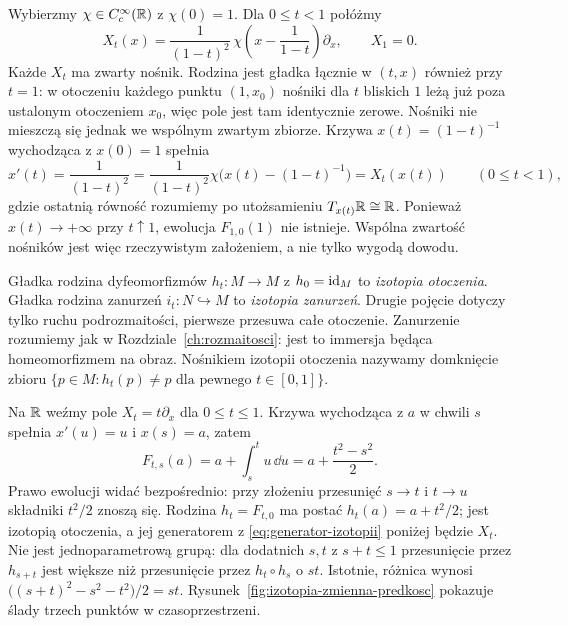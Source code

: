 \begin{przyklad}
Wybierzmy $\chi\in C_c^\infty(\mathbb{R})$ z $\chi(0)=1$.
Dla $0\le t<1$ połóżmy
\[
X_t(x)=\frac{1}{(1-t)^2}\,
\chi\!\left(x-\frac{1}{1-t}\right)\partial_x,
\qquad X_1=0.
\]
Każde $X_t$ ma zwarty nośnik. Rodzina jest gładka łącznie
w $(t,x)$ również przy $t=1$: w otoczeniu każdego punktu
$(1,x_0)$ nośniki dla $t$ bliskich $1$ leżą już poza ustalonym
otoczeniem $x_0$, więc pole jest tam identycznie zerowe.
Nośniki nie mieszczą się jednak we wspólnym zwartym zbiorze.
Krzywa $x(t)=(1-t)^{-1}$ wychodząca z $x(0)=1$ spełnia
\[
x'(t)=\frac{1}{(1-t)^2}
=\frac{1}{(1-t)^2}\chi\bigl(x(t)-(1-t)^{-1}\bigr)
=X_t(x(t))
\qquad(0\le t<1),
\]
gdzie ostatnią równość rozumiemy po utożsamieniu
$T_{x(t)}\mathbb{R}\cong\mathbb{R}$. Ponieważ $x(t)\to+\infty$ przy $t\uparrow1$,
ewolucja $F_{1,0}(1)$ nie istnieje. Wspólna zwartość nośników
jest więc rzeczywistym założeniem, a nie tylko wygodą dowodu.
\end{przyklad}

\begin{definicja}
Gładka rodzina dyfeomorfizmów $h_t\colon M\to M$ z
$h_0=\mathrm{id}_M$ to \emph{izotopia otoczenia}.
Gładka rodzina zanurzeń $i_t\colon N\hookrightarrow M$ to
\emph{izotopia zanurzeń}. Drugie pojęcie dotyczy tylko ruchu
podrozmaitości, pierwsze przesuwa całe otoczenie.
Zanurzenie rozumiemy jak w Rozdziale~\ref{ch:rozmaitosci}:
jest to immersja będąca homeomorfizmem na obraz.
Nośnikiem izotopii otoczenia nazywamy domknięcie zbioru
$\{p\in M:h_t(p)\ne p\text{ dla pewnego }t\in[0,1]\}$.
\end{definicja}

\begin{przyklad}
Na $\mathbb{R}$ weźmy pole $X_t=t\partial_x$ dla $0\le t\le1$.
Krzywa wychodząca z $a$ w chwili $s$ spełnia
$x'(u)=u$ i $x(s)=a$, zatem
\[
F_{t,s}(a)=a+\int_s^t u\,\dd u
=a+\frac{t^2-s^2}{2}.
\]
Prawo ewolucji widać bezpośrednio: przy złożeniu przesunięć
$s\to t$ i $t\to u$ składniki $t^2/2$ znoszą się.
Rodzina $h_t=F_{t,0}$ ma postać $h_t(a)=a+t^2/2$;
jest izotopią otoczenia, a jej generatorem z
\eqref{eq:generator-izotopii} poniżej będzie $X_t$.
Nie jest jednoparametrową grupą: dla dodatnich $s,t$ z
$s+t\le1$ przesunięcie przez $h_{s+t}$ jest większe niż
przesunięcie przez $h_t\circ h_s$ o $st$.
Istotnie, różnica wynosi
$\bigl((s+t)^2-s^2-t^2\bigr)/2=st$.
Rysunek~\ref{fig:izotopia-zmienna-predkosc} pokazuje ślady
trzech punktów w czasoprzestrzeni.
\end{przyklad}


